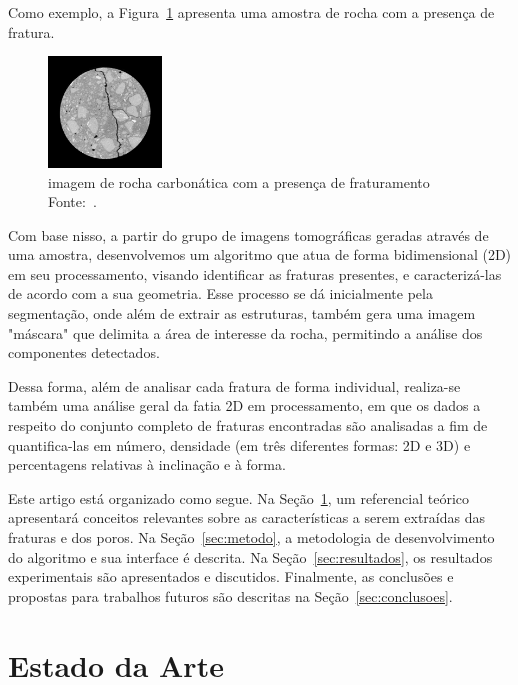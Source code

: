 \documentclass[a4paper,10pt,twocolumn,twoside]{article}
\begin{document}
Como exemplo, a Figura~\ref{fig:microct} apresenta uma amostra de rocha com a presença de fratura.

\begin{figure}[!htb]
\centering
\includegraphics[width=0.27\textwidth]{Figuras/fratura.png} \hspace*{0.1cm}

\caption{imagem de rocha carbonática com a presença de fraturamento  Fonte:~\cite{dataFracture1}.}
\label{fig:microct}
\end{figure}

Com base nisso, a partir do grupo de imagens tomográficas geradas através de uma amostra, desenvolvemos um algoritmo que atua de forma bidimensional (2D) em seu processamento, visando identificar as fraturas presentes, e caracterizá-las de acordo com a sua geometria. Esse processo se dá inicialmente pela segmentação, onde além de extrair as estruturas, também gera uma imagem "máscara" que delimita a área de interesse da rocha, permitindo a análise dos componentes detectados.

Dessa forma, além de analisar cada fratura de forma individual, realiza-se também uma análise geral da fatia 2D em processamento, em que os dados a respeito do conjunto completo de fraturas encontradas são analisadas a fim de quantifica-las em número, densidade (em três diferentes formas: 2D e 3D) e percentagens relativas à inclinação e à forma. 

Este artigo está organizado como segue. Na Seção~\ref{sec:estado_arte}, um referencial teórico apresentará conceitos relevantes sobre as características a serem extraídas das fraturas e dos poros. Na Seção~\ref{sec:metodo}, a metodologia de desenvolvimento do algoritmo e sua interface é descrita. Na Seção~\ref{sec:resultados}, os resultados experimentais são apresentados e discutidos. Finalmente, as conclusões e propostas para trabalhos futuros são descritas na Seção~\ref{sec:conclusoes}.

\section{Estado da Arte}
\label{sec:estado_arte}
\end{document}
